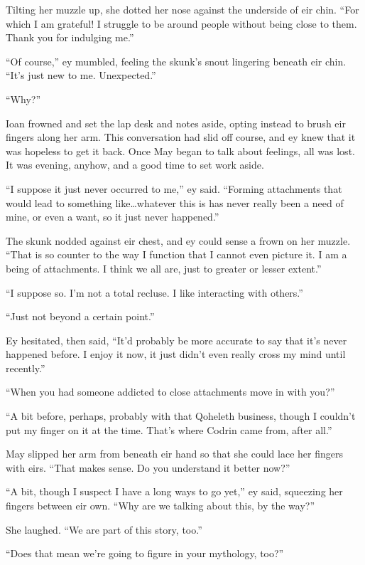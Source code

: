 Tilting her muzzle up, she dotted her nose against the underside of eir chin. ``For which I am grateful! I struggle to be around people without being close to them. Thank you for indulging me.''

``Of course,'' ey mumbled, feeling the skunk's snout lingering beneath eir chin. ``It's just new to me. Unexpected.''

``Why?''

Ioan frowned and set the lap desk and notes aside, opting instead to brush eir fingers along her arm. This conversation had slid off course, and ey knew that it was hopeless to get it back. Once May began to talk about feelings, all was lost. It was evening, anyhow, and a good time to set work aside.

``I suppose it just never occurred to me,'' ey said. ``Forming attachments that would lead to something like\ldots whatever this is has never really been a need of mine, or even a want, so it just never happened.''

The skunk nodded against eir chest, and ey could sense a frown on her muzzle. ``That is so counter to the way I function that I cannot even picture it. I am a being of attachments. I think we all are, just to greater or lesser extent.''

``I suppose so. I'm not a total recluse. I like interacting with others.''

``Just not beyond a certain point.''

Ey hesitated, then said, ``It'd probably be more accurate to say that it's never happened before. I enjoy it now, it just didn't even really cross my mind until recently.''

``When you had someone addicted to close attachments move in with you?''

``A bit before, perhaps, probably with that Qoheleth business, though I couldn't put my finger on it at the time. That's where Codrin came from, after all.''

May slipped her arm from beneath eir hand so that she could lace her fingers with eirs. ``That makes sense. Do you understand it better now?''

``A bit, though I suspect I have a long ways to go yet,'' ey said, squeezing her fingers between eir own. ``Why are we talking about this, by the way?''

She laughed. ``We are part of this story, too.''

``Does that mean we're going to figure in your mythology, too?''

